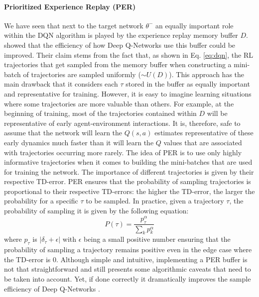\paragraph{\textbf{\uppercase{P}rioritized \uppercase{E}xperience \uppercase{R}eplay (\uppercase{PER})}} We have seen that next to the target network $\theta^{-}$ an equally important role within the DQN algorithm is played by the experience replay memory buffer $D$. \citet{schaul2015prioritized} showed that the efficiency of how Deep Q-Networks use this buffer could be improved. Their claim stems from the fact that, as shown in Eq. \ref{eq:dqn}, the RL trajectories that get sampled from the memory buffer when constructing a mini-batch of trajectories are sampled uniformly ($\sim U(D)$). This approach has the main drawback that it considers each $\tau$ stored in the buffer as equally important and representative for training. However, it is easy to imagine learning situations where some trajectories are more valuable than others. For example, at the beginning of training, most of the trajectories contained within $D$ will be representative of early agent-environment interactions. It is, therefore, safe to assume that the network will learn the $Q(s,a)$ estimates representative of these early dynamics much faster than it will learn the $Q$ values that are associated with trajectories occurring more rarely. The idea of PER is to use only highly informative trajectories when it comes to building the mini-batches that are used for training the network. The importance of different trajectories is given by their respective TD-error. PER ensures that the probability of sampling trajectories is proportional to their respective TD-errors: the higher the TD-error, the larger the probability for a specific $\tau$ to be sampled. In practice, given a trajectory $\tau$, the probability of sampling it is given by the following equation:
\begin{equation}
	P(\tau)=\frac{p_{\tau}^{\alpha}}{\sum_k p_{k}^{\alpha}}
\end{equation}
where $p_{\tau}$ is $|\delta_\tau + \epsilon|$ with $\epsilon$ being a small positive number ensuring that the probability of sampling a trajectory remains positive even in the edge case where the TD-error is $0$. Although simple and intuitive, implementing a PER buffer is not that straightforward and still presents some algorithmic caveats that need to be taken into account. Yet, if done correctly it dramatically improves the sample efficiency of Deep Q-Networks \cite{narasimhan2015language}.

